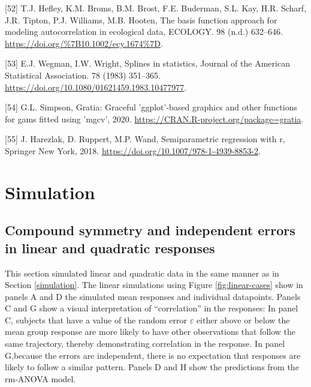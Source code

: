 \documentclass[
]{article}
\begin{document}
\leavevmode\hypertarget{ref-hefley2017}{}%
{[}52{]} T.J. Hefley, K.M. Broms, B.M. Brost, F.E. Buderman, S.L. Kay, H.R. Scharf, J.R. Tipton, P.J. Williams, M.B. Hooten, The basis function approach for modeling autocorrelation in ecological data, ECOLOGY. 98 (n.d.) 632--646. \url{https://doi.org/\%7B10.1002/ecy.1674\%7D}.

\leavevmode\hypertarget{ref-wegman1983}{}%
{[}53{]} E.J. Wegman, I.W. Wright, Splines in statistics, Journal of the American Statistical Association. 78 (1983) 351--365. \url{https://doi.org/10.1080/01621459.1983.10477977}.

\leavevmode\hypertarget{ref-gratia}{}%
{[}54{]} G.L. Simpson, Gratia: Graceful 'ggplot'-based graphics and other functions for gams fitted using 'mgcv', 2020. \url{https://CRAN.R-project.org/package=gratia}.

\leavevmode\hypertarget{ref-harezlak2018}{}%
{[}55{]} J. Harezlak, D. Ruppert, M.P. Wand, Semiparametric regression with r, Springer New York, 2018. \url{https://doi.org/10.1007/978-1-4939-8853-2}.

\hypertarget{appendix-appendix}{%
\appendix}


\hypertarget{simulation-1}{%
\section{Simulation}\label{simulation-1}}

\hypertarget{compound-symmetry-and-independent-errors-in-linear-and-quadratic-responses}{%
\subsection{Compound symmetry and independent errors in linear and quadratic responses}\label{compound-symmetry-and-independent-errors-in-linear-and-quadratic-responses}}

This section simulated linear and quadratic data in the same manner as in Section \ref{simulation}. The linear simulations using Figure \ref{fig:linear-cases} show in panels A and D the simulated mean responses and individual datapoints. Panels C and G show a visual interpretation of ``correlation'' in the responses: In panel C, subjects that have a value of the random error \(\varepsilon\) either above or below the mean group response are more likely to have other observations that follow the same trajectory, thereby demonstrating correlation in the response. In panel G,because the errors are independent, there is no expectation that responses are likely to follow a similar pattern. Panels D and H show the predictions from the rm-ANOVA model.
\end{document}
